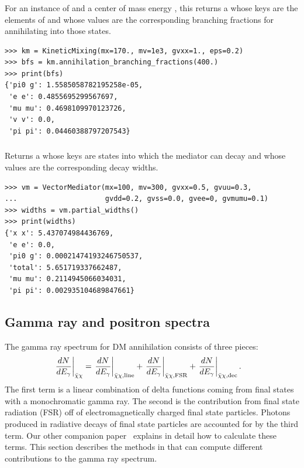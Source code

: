 \subsubsection{} 

For an instance  of  and a center of mass energy , this returns a  whose keys are the elements of  and whose values are the corresponding branching fractions for annihilating into those states.
\begin{verbatim}
>>> km = KineticMixing(mx=170., mv=1e3, gvxx=1., eps=0.2)
>>> bfs = km.annihilation_branching_fractions(400.)
>>> print(bfs)
{'pi0 g': 1.5585058782195258e-05,
 'e e': 0.4855695299567697,
 'mu mu': 0.4698109970123726,
 'v v': 0.0,
 'pi pi': 0.04460388797207543}
\end{verbatim}

\subsubsection{}

Returns a  whose keys are states into which the mediator can decay and whose values are the corresponding decay widths.
\begin{verbatim}
>>> vm = VectorMediator(mx=100, mv=300, gvxx=0.5, gvuu=0.3,
...                     gvdd=0.2, gvss=0.0, gvee=0, gvmumu=0.1)
>>> widths = vm.partial_widths()
>>> print(widths)
{'x x': 5.437074984436769,
 'e e': 0.0,
 'pi0 g': 0.00021474193246750537,
 'total': 5.651719337662487,
 'mu mu': 0.2114945066034031,
 'pi pi': 0.002935104689847661}
\end{verbatim}

\subsection{Gamma ray and positron spectra}

The gamma ray spectrum for DM annihilation consists of three pieces:
\begin{align}
    \left. \frac{dN}{dE_\gamma} \right|_{\bar{\chi}\chi} &= \left. \frac{dN}{dE_\gamma} \right|_{\bar{\chi}\chi,{\mathrm{line}}} + \left. \frac{dN}{dE_\gamma} \right|_{\bar{\chi}\chi,{\mathrm{FSR}}} + \left. \frac{dN}{dE_\gamma} \right|_{\bar{\chi}\chi,{\mathrm{dec}}}.
\end{align}
The first term is a linear combination of delta functions coming from final states with a monochromatic gamma ray. The second is the contribution from final state radiation (FSR) off of electromagnetically charged final state particles. Photons produced in radiative decays of final state particles are accounted for by the third term. Our other companion paper~\cite{spectrum_paper} explains in detail how to calculate these terms. This section describes the methods in  that can compute different contributions to the gamma ray spectrum.

